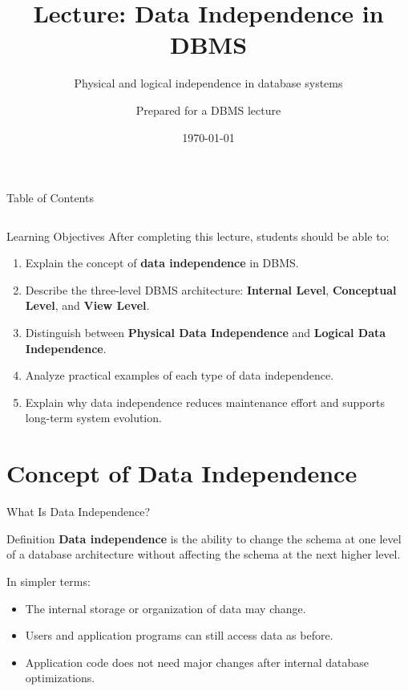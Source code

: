 \documentclass[aspectratio=169,11pt]{beamer}
\title[Data Independence in DBMS]{Lecture: Data Independence in DBMS}
\subtitle{Physical and logical independence in database systems}
\author{Prepared for a DBMS lecture}
\date{\today}
\begin{document}
\begin{frame}
  \titlepage
\end{frame}

\begin{frame}{Table of Contents}
\begin{columns}[T,totalwidth=\textwidth]
  \tableofcontents[sections={1-4},hideallsubsections]
  \tableofcontents[sections={5-8},hideallsubsections]
\end{columns}
\end{frame}

\begin{frame}{Learning Objectives}
After completing this lecture, students should be able to:
\begin{enumerate}
  \item Explain the concept of \textbf{data independence} in DBMS.
  \item Describe the three-level DBMS architecture: \textbf{Internal Level}, \textbf{Conceptual Level}, and \textbf{View Level}.
  \item Distinguish between \textbf{Physical Data Independence} and \textbf{Logical Data Independence}.
  \item Analyze practical examples of each type of data independence.
  \item Explain why data independence reduces maintenance effort and supports long-term system evolution.
\end{enumerate}
\end{frame}

\section{Concept of Data Independence}

\begin{frame}{What Is Data Independence?}
\begin{block}{Definition}
\textbf{Data independence} is the ability to change the schema at one level of a database architecture without affecting the schema at the next higher level.
\end{block}

\vspace{0.3cm}
In simpler terms:
\begin{itemize}
  \item The internal storage or organization of data may change.
  \item Users and application programs can still access data as before.
  \item Application code does not need major changes after internal database optimizations.
\end{itemize}
\end{frame}
\end{document}
